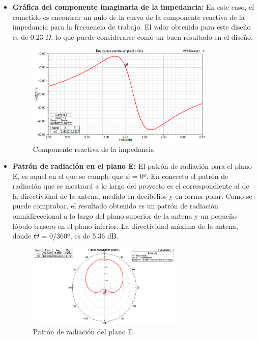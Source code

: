 \begin{itemize}
\item \textbf{Gráfica del componente imaginaria de la impedancia: }En este caso, el cometido es encontrar un nulo de la curva de la componente reactiva de la impedancia para la frecuencia de trabajo. El valor obtenido para este diseño es de 0.23 $\Omega$, lo que puede considerarse como un buen resultado en el diseño.
	\begin{figure}[H]
    \centering
        \includegraphics[width=0.85\textwidth]{archivos/analisis/1x11/2}
        \caption{Componente reactiva de la impedancia}
        \label{fig:imaimpe}
	\end{figure}

\item \textbf{Patrón de radiación en el plano E: }El patrón de radiación para el plano E, es aquel en el que se cumple que $\phi $ = 0º. En concreto el patrón de radiación que se mostrará a lo largo del proyecto es el correspondiente al de la directividad de la antena, medido en decibelios y en forma polar. Como se puede comprobar, el resultado obtenido es un patrón de radiación omnidireccional a lo largo del plano superior de la antena y un pequeño lóbulo trasero en el plano inferior. La directividad máxima de la antena, donde $\Theta$ = 0/360º, es de 5.36 dB. 
	\begin{figure}[H]
    \centering
        \includegraphics[width=0.7\textwidth]{archivos/analisis/1x11/4}
        \caption{Patrón de radiación del plano E}
        \label{fig:radE}
	\end{figure}


\end{itemize}
